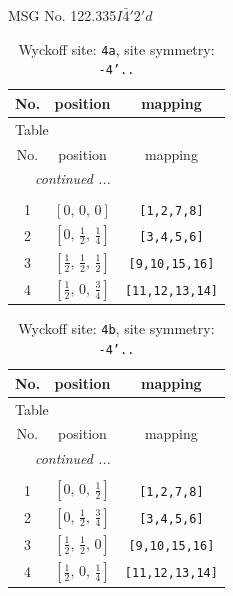 \documentclass[fleqn,8pt]{jsarticle}
\begin{document}
\setcounter{MaxMatrixCols}{32}

\renewcommand{\tablename}{Table~}
\renewcommand{\figurename}{Figure~}
\begin{center}
\LARGE
MSG No. 122.335\quad$I\bar{4}'2'd$
\end{center}
\renewcommand{\arraystretch}{1.2}
\begin{longtable}{ccc}
\caption{Wyckoff site: {\tt 4a}, site symmetry: {\tt -4'..}}
 \\
 \hline \hline
No. & position & mapping \\ \hline \endfirsthead

\multicolumn{2}{l}{\tablename\ \thetable{}} \\
 \hline \hline
No. & position & mapping \\ \hline \endhead

 \hline \hline
\multicolumn{2}{r}{\footnotesize\it continued ...} \\ \endfoot

 \hline \hline
\multicolumn{2}{r}{} \\ \endlastfoot

1 & $\left[ 0,\, 0,\, 0 \right]$ & {\tt [1,2,7,8]} \\ \hline
2 & $\left[ 0,\, \frac{1}{2},\, \frac{1}{4} \right]$ & {\tt [3,4,5,6]} \\ \hline
3 & $\left[ \frac{1}{2},\, \frac{1}{2},\, \frac{1}{2} \right]$ & {\tt [9,10,15,16]} \\ \hline
4 & $\left[ \frac{1}{2},\, 0,\, \frac{3}{4} \right]$ & {\tt [11,12,13,14]} \\
\end{longtable}
\renewcommand{\arraystretch}{1.2}
\begin{longtable}{ccc}
\caption{Wyckoff site: {\tt 4b}, site symmetry: {\tt -4'..}}
 \\
 \hline \hline
No. & position & mapping \\ \hline \endfirsthead

\multicolumn{2}{l}{\tablename\ \thetable{}} \\
 \hline \hline
No. & position & mapping \\ \hline \endhead

 \hline \hline
\multicolumn{2}{r}{\footnotesize\it continued ...} \\ \endfoot

 \hline \hline
\multicolumn{2}{r}{} \\ \endlastfoot

1 & $\left[ 0,\, 0,\, \frac{1}{2} \right]$ & {\tt [1,2,7,8]} \\ \hline
2 & $\left[ 0,\, \frac{1}{2},\, \frac{3}{4} \right]$ & {\tt [3,4,5,6]} \\ \hline
3 & $\left[ \frac{1}{2},\, \frac{1}{2},\, 0 \right]$ & {\tt [9,10,15,16]} \\ \hline
4 & $\left[ \frac{1}{2},\, 0,\, \frac{1}{4} \right]$ & {\tt [11,12,13,14]} \\
\end{longtable}
\end{document}
